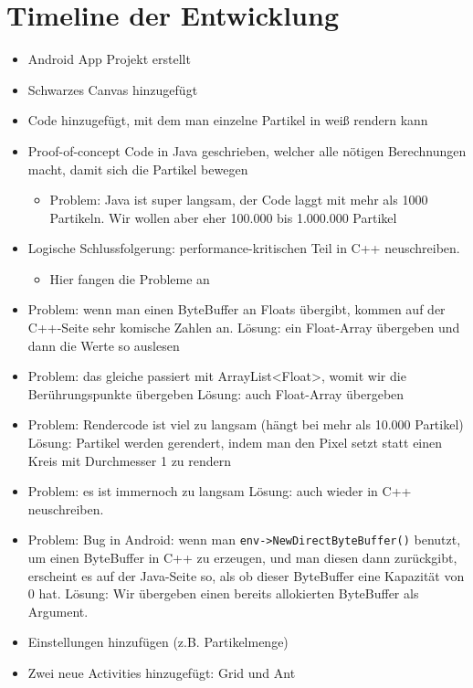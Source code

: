\documentclass[8pt, letterpaper]{article}
\begin{document}
\section{Timeline der Entwicklung}
\begin{itemize}
    \item Android App Projekt erstellt
    \item Schwarzes Canvas hinzugefügt
    \item Code hinzugefügt, mit dem man einzelne Partikel in weiß rendern kann
    \item Proof-of-concept Code in Java geschrieben, welcher alle nötigen Berechnungen macht, damit sich die Partikel bewegen
    \begin{itemize} \item Problem: Java ist super langsam, der Code laggt mit mehr als 1000 Partikeln. Wir wollen aber eher 100.000 bis 1.000.000 Partikel \end{itemize}
    \item Logische Schlussfolgerung: performance-kritischen Teil in C++ neuschreiben.
    \begin{itemize} \item Hier fangen die Probleme an \end{itemize}
    \item Problem: wenn man einen ByteBuffer an Floats übergibt, kommen auf der C++-Seite sehr komische Zahlen an. Lösung: ein Float-Array übergeben und dann die Werte so auslesen
    \item Problem: das gleiche passiert mit ArrayList<Float>, womit wir die Berührungspunkte übergeben Lösung: auch Float-Array übergeben
    \item Problem: Rendercode ist viel zu langsam (hängt bei mehr als 10.000 Partikel) Lösung: Partikel werden gerendert, indem man den Pixel setzt statt einen Kreis mit Durchmesser 1 zu rendern
    \item Problem: es ist immernoch zu langsam Lösung: auch wieder in C++ neuschreiben.
    \item Problem: Bug in Android: wenn man \texttt{env->NewDirectByteBuffer()} benutzt, um einen ByteBuffer in C++ zu erzeugen, und man diesen dann zurückgibt, erscheint es auf der Java-Seite so, als ob dieser ByteBuffer eine Kapazität von 0 hat. Lösung: Wir übergeben einen bereits allokierten ByteBuffer als Argument.
    \item Einstellungen hinzufügen (z.B. Partikelmenge)
    \item Zwei neue Activities hinzugefügt: Grid und Ant

\end{itemize}
\end{document}
